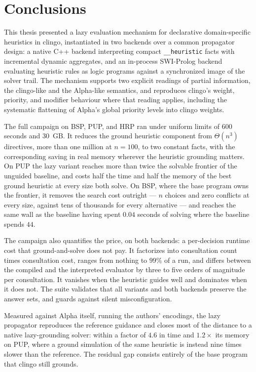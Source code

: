 \section{Conclusions}

This thesis presented a lazy evaluation mechanism for declarative domain-specific heuristics in clingo, instantiated in two backends over a common propagator design: a native C++ backend interpreting compact \texttt{\_\_heuristic} facts with incremental dynamic aggregates, and an in-process SWI-Prolog backend evaluating heuristic rules as logic programs against a synchronized image of the solver trail. The mechanism supports two explicit readings of partial information, the clingo-like and the Alpha-like semantics, and reproduces clingo's weight, priority, and modifier behaviour where that reading applies, including the systematic flattening of Alpha's global priority levels into clingo weights.

The full campaign on BSP, PUP, and HRP ran under uniform limits of 600 seconds and 30~GB. It reduces the ground heuristic component from $\Theta(n^3)$ directives, more than one million at $n=100$, to two constant facts, with the corresponding saving in real memory wherever the heuristic grounding matters. On PUP the lazy variant reaches more than twice the solvable frontier of the unguided baseline, and costs half the time and half the memory of the best ground heuristic at every size both solve. On BSP, where the base program owns the frontier, it removes the search cost outright --- $n$ choices and zero conflicts at every size, against tens of thousands for every alternative --- and reaches the same wall as the baseline having spent $0.04$ seconds of solving where the baseline spends $44$.

The campaign also quantifies the price, on both backends: a per-decision runtime cost that ground-and-solve does not pay. It factorizes into consultation count times consultation cost, ranges from nothing to $99\%$ of a run, and differs between the compiled and the interpreted evaluator by three to five orders of magnitude per consultation. It vanishes when the heuristic guides well and dominates when it does not. The suite validates that all variants and both backends preserve the answer sets, and guards against silent misconfiguration.

Measured against Alpha itself, running the authors' encodings, the lazy propagator reproduces the reference guidance and closes most of the distance to a native lazy-grounding solver: within a factor of $4.6$ in time and $1.2\times$ its memory on PUP, where a ground simulation of the same heuristic is instead nine times slower than the reference. The residual gap consists entirely of the base program that clingo still grounds.

